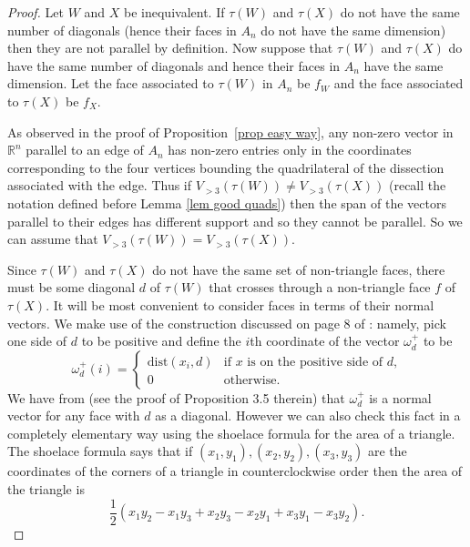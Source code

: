 \documentclass[11pt]{article}
\newcommand{\R}{\mathbb{R}}
\theoremstyle{remark}
\theoremstyle{definition}
\begin{document}
\begin{proof}
  Let $W$ and $X$ be inequivalent.  If $\tau(W)$ and $\tau(X)$ do not have the same number of diagonals (hence their faces in $A_n$ do not have the same dimension) then they are not parallel by definition. Now suppose that $\tau(W)$ and $\tau(X)$ do have the same number of diagonals and hence their faces in $A_n$ have the same dimension.  Let the face associated to $\tau(W)$ in $A_n$ be $f_W$ and the face associated to $\tau(X)$ be $f_X$.

As observed in the proof of Proposition~\ref{prop easy way}, any non-zero vector in $\R^n$ parallel to an edge of $A_n$ has non-zero entries only in the coordinates corresponding to the four vertices bounding the quadrilateral of the dissection associated with the edge.  Thus if $V_{>3}(\tau(W)) \neq V_{>3}(\tau(X))$ (recall the notation defined before Lemma \ref{lem good quads}) then the span of the vectors parallel to their edges has different support and so they cannot be parallel.  So we can assume that $V_{>3}(\tau(W)) = V_{>3}(\tau(X))$.

    Since $\tau(W)$ and $\tau(X)$ do not have the same set of non-triangle faces, there must be some diagonal $d$ of $\tau(W)$ that crosses through a non-triangle face $f$ of $\tau(X)$. 
    It will be most convenient to consider faces in terms of their normal vectors. We make use of the construction discussed on page 8 of \cite{CSZinequivalent}: namely, pick one side of $d$ to be positive and define the $i$th coordinate of the vector $\omega^+_d$ to be
    \[
    \omega^+_d(i) = \begin{cases} \text{dist}(x_i, d) & \text{if $x$ is on the positive side of $d$,}\\ 0 & \text{otherwise.} \end{cases}
    \]
    We have from \cite{CSZinequivalent} (see the proof of Proposition 3.5 therein) that $\omega^+_d$ is a normal vector for any face with $d$ as a diagonal.  However we can also check this fact in a completely elementary way using the shoelace formula for the area of a triangle.  The shoelace formula says that if $(x_1, y_1), (x_2, y_2), (x_3, y_3)$ are the coordinates of the corners of a triangle in counterclockwise order then the area of the triangle is \[\textstyle\frac{1}{2}(x_1y_2 - x_1y_3 + x_2y_3 - x_2y_1 + x_3y_1 - x_3y_2).\]


\end{proof}
\end{document}
